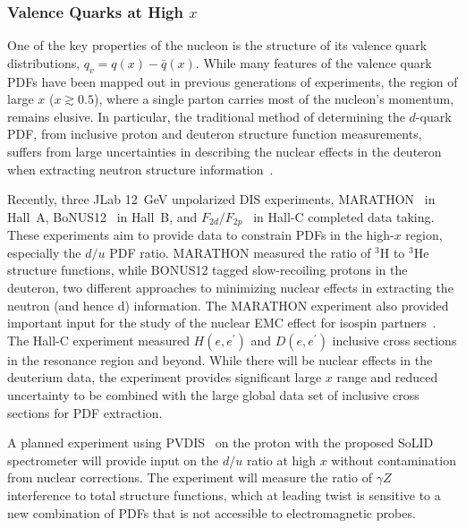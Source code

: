 \subsubsection*{Valence Quarks at High $x$}
\label{sec:duRatio}

One of the key properties of the nucleon is the structure of its valence quark distributions, $q_v = q(x)-\bar q(x)$.
While many features of the valence quark PDFs have been mapped out in previous generations of experiments, the region of large %
$x$ ($x \gtrsim 0.5$), where a single parton carries most of the nucleon's momentum, remains elusive. 
In particular, the traditional method of determining the $d$-quark PDF, from inclusive proton and deuteron structure function measurements, suffers from large uncertainties in describing the nuclear effects in the deuteron when extracting neutron structure information~\cite{Melnitchouk:1995fc, Accardi:2016qay}.%


Recently, three JLab 12~GeV unpolarized DIS experiments, MARATHON~\cite{Abrams:2021xum} in Hall~A, BoNUS12~\cite{BONUS12} in Hall~B, and $F_{2d}/F_{2p}$~\cite{Niculescu:201002} in Hall-C completed data taking. These experiments aim to provide data to constrain PDFs in the high-$x$ region, especially the $d/u$ PDF ratio.
MARATHON measured the ratio of $^3$H to $^3$He structure functions, while BONUS12 tagged slow-recoiling protons in the deuteron, two different approaches to minimizing nuclear effects in extracting the neutron (and hence d) information. 
The MARATHON experiment also provided important input for the study of the nuclear EMC effect for isospin partners~\cite{Cocuzza:2021rfn}. The Hall-C experiment measured $H(e,e^\prime )$ and $D(e,e^\prime )$ inclusive cross sections in the resonance region and beyond. While there will be nuclear effects in the deuterium data, the experiment provides significant large $x$ range and reduced uncertainty to be combined with the large global data set of inclusive cross sections for PDF extraction. 

A planned experiment using PVDIS~\cite{PVDIS} on the proton with the proposed SoLID~\cite{SoLID} spectrometer will provide input on the $d/u$ ratio at high $x$ without contamination from nuclear corrections.
The experiment will measure the ratio of $\gamma Z$ interference to total structure functions, which at leading twist is sensitive to a new combination of PDFs that is not accessible to electromagnetic probes.

